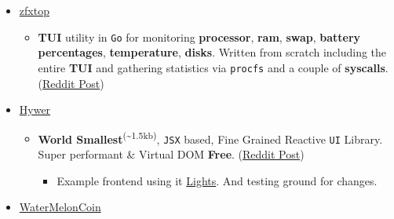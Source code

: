 \begin{itemize}
\tightlist
\item
  \href{https://github.com/ssleert/zfxtop}{zfxtop}

  \begin{itemize}
  \tightlist
  \item
    \label{Ryabinkovux20Semyonux20Pavlovich-Petux20Projects-TUI}{}\textbf{TUI}
    utility in \texttt{Go} for monitoring
    \label{Ryabinkovux20Semyonux20Pavlovich-Petux20Projects-processor}{}\textbf{processor},
    \label{Ryabinkovux20Semyonux20Pavlovich-Petux20Projects-ram}{}\textbf{ram},
    \label{Ryabinkovux20Semyonux20Pavlovich-Petux20Projects-swap}{}\textbf{swap},
    \label{Ryabinkovux20Semyonux20Pavlovich-Petux20Projects-batteryux20percentages}{}\textbf{battery
    percentages},
    \label{Ryabinkovux20Semyonux20Pavlovich-Petux20Projects-temperature}{}\textbf{temperature},
    \label{Ryabinkovux20Semyonux20Pavlovich-Petux20Projects-disks}{}\textbf{disks}.
    Written from scratch including the entire
    \label{Ryabinkovux20Semyonux20Pavlovich-Petux20Projects-TUI}{}\textbf{TUI}
    and gathering statistics via \texttt{procfs} and a couple of
    \label{Ryabinkovux20Semyonux20Pavlovich-Petux20Projects-syscalls}{}\textbf{syscalls}.
    (\href{https://www.reddit.com/r/unixporn/comments/11cfas8/oc_zfxtop_fetch_top_for_gen_z_with_x}{Reddit
    Post})
  \end{itemize}
\item
  \href{https://github.com/ssleert/hywer}{Hywer}

  \begin{itemize}
  \tightlist
  \item
    \label{Ryabinkovux20Semyonux20Pavlovich-Petux20Projects-Worldux20Smallest}{}\textbf{World
    Smallest}\textsuperscript{{(\textasciitilde1.5kb)}}, \texttt{JSX}
    based, Fine Grained Reactive \texttt{UI} Library. Super performant
    \& Virtual DOM
    \label{Ryabinkovux20Semyonux20Pavlovich-Petux20Projects-Free}{}\textbf{Free}.
    (\href{https://www.reddit.com/r/javascript/comments/1b8j23r/hywerjs_world_smallest_1kb_jsxbased_reactive_ui}{Reddit
    Post})

    \begin{itemize}
    \tightlist
    \item
      Example frontend using it
      \href{https://github.com/Lights-Social/lights-web-hywer}{Lights}.
      And testing ground for changes.
    \end{itemize}
  \end{itemize}
\item
  \href{https://github.com/ssleert/WaterMelonCoin}{WaterMelonCoin}


\end{itemize}
